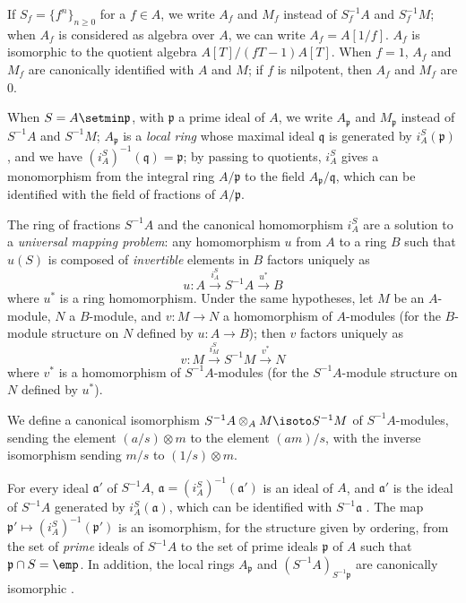 \begin{env}[1.2.3]
\label{0.1.2.3}
If $S_f=\{f^n\}_{n\geq 0}$ for a $f\in A$, we write $A_f$ and $M_f$ instead
of $S_f^{-1}A$ and $S_f^{-1}M$; when $A_f$ is considered as algebra over $A$, we
can write $A_f=A[1/f]$. $A_f$ is isomorphic to the quotient algebra
$A[T]/(fT-1)A[T]$. When $f=1$, $A_f$ and $M_f$ are canonically identified with $A$ and
$M$; if $f$ is nilpotent, then $A_f$ and $M_f$ are $0$.

When $S=A\setmin\mathfrak{p}$, with $\mathfrak{p}$ a prime ideal of $A$, we write
$A_\mathfrak{p}$ and $M_\mathfrak{p}$ instead of $S^{-1}A$ and $S^{-1}M$;
$A_\mathfrak{p}$ is a \emph{local ring} whose maximal ideal $\mathfrak{q}$ is
generated by $i_A^S(\mathfrak{p})$, and we have
$(i_A^S)^{-1}(\mathfrak{q})=\mathfrak{p}$; by passing to quotients, $i_A^S$
gives a monomorphism from the integral ring $A/\mathfrak{p}$ to the field
$A_\mathfrak{p}/\mathfrak{q}$, which can be identified with the field of fractions of
$A/\mathfrak{p}$.
\end{env}

\begin{env}[1.2.4]
\label{0.1.2.4}
The ring of fractions $S^{-1}A$ and the canonical homomorphism $i_A^S$ are a
solution to a \emph{universal mapping problem}: any homomorphism $u$ from $A$ to
a ring $B$ such that $u(S)$ is composed of \emph{invertible} elements in $B$
factors uniquely as
\[
  u:A\xrightarrow{i_A^S}S^{-1}A\xrightarrow{u^*}B
\]
where
$u^*$ is a ring homomorphism.
Under the same hypotheses, let $M$ be an $A$-module, $N$ a $B$-module, and $v:M\to N$ a homomorphism of $A$-modules (for the $B$-module structure on $N$ defined by $u:A\to B$); then $v$ factors uniquely as
\[
  v:M\xrightarrow{i_M^S}S^{-1}M\xrightarrow{v^*}N
\]
where $v^*$ is a homomorphism of $S^{-1}A$-modules (for the $S^{-1}A$-module structure on $N$ defined by $u^*$).
\end{env}

\begin{env}[1.2.5]
\label{0.1.2.5}
We define a canonical isomorphism $S^{-1}A\otimes_A M\isoto S^{-1}M$ of $S^{-1}A$-modules, sending the element $(a/s)\otimes m$ to the element $(am)/s$, with the inverse isomorphism sending $m/s$ to $(1/s)\otimes m$.
\end{env}

\begin{env}[1.2.6]
\label{0.1.2.6}
For every ideal $\mathfrak{a}'$ of $S^{-1}A$, $\mathfrak{a}=(i_A^S)^{-1}(\mathfrak{a}')$ is an ideal of $A$, and
$\mathfrak{a}'$ is the ideal of $S^{-1}A$ generated by $i_A^S(\mathfrak{a})$,
which can be identified with $S^{-1}\mathfrak{a}$ . The map
$\mathfrak{p}'\mapsto(i_A^S)^{-1}(\mathfrak{p}')$ is an isomorphism, for the structure given by ordering, from the set of \emph{prime} ideals of $S^{-1}A$ to the set of
prime ideals $\mathfrak{p}$ of $A$ such that $\mathfrak{p}\cap S=\emp$. In
addition, the local rings $A_\mathfrak{p}$ and $(S^{-1}A)_{S^{-1}\mathfrak{p}}$
are canonically isomorphic .
\end{env}

